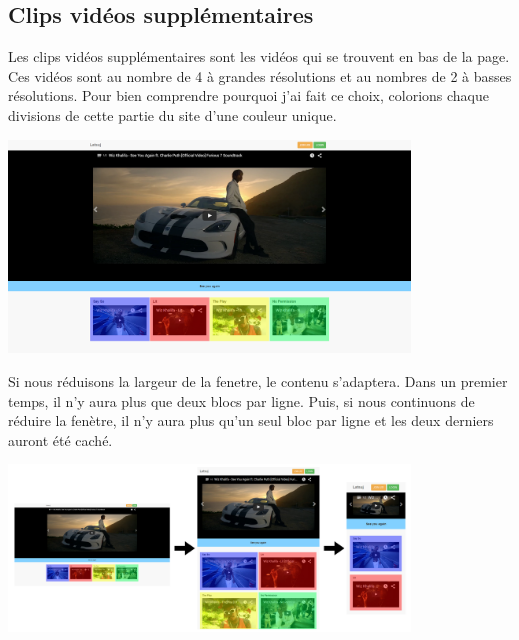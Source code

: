 \documentclass{article}
\begin{document}
\subsection{Clips vid\'eos suppl\'ementaires}

Les clips vid\'eos suppl\'ementaires sont les vid\'eos qui se trouvent en bas de la page. Ces vid\'eos sont au nombre de 4 \`a grandes r\'esolutions et au nombres de 2 \`a basses r\'esolutions. Pour bien comprendre pourquoi j'ai fait ce choix, colorions chaque divisions de cette partie du site d'une couleur unique.
\begin{center}
\vspace{0.5cm}
\includegraphics[width=0.8\textwidth]{pc4}
\vspace{0.5cm}
\end{center}

Si nous r\'eduisons la largeur de la fenetre, le contenu s'adaptera. Dans un premier temps, il n'y aura plus que deux blocs par ligne. Puis, si nous continuons de r\'eduire la fen\`etre, il n'y aura plus qu'un seul bloc par ligne et les deux derniers auront \'et\'e cach\'e.
\begin{center}
\vspace{0.5cm}
\includegraphics[width=0.8\textwidth]{pc7}
\vspace{0.5cm}\\
\end{center}
\end{document}
